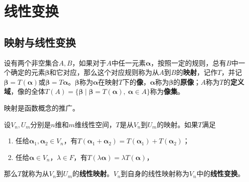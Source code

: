 


\section{线性变换}

\subsection{映射与线性变换}
\begin{definition}[映射]
设有两个非空集合$A,B$，如果对于$A$中任一元素$\boldsymbol{\alpha}$，按照一定的规则，总有$B$中一个确定的元素$\boldsymbol{\beta}$和它对应，那么这个对应规则称为从$A$到$B$的\textbf{映射}，记作$T$，并记$\boldsymbol{\beta}=T(\boldsymbol{\alpha})$或$\boldsymbol{\beta}=T\boldsymbol{\alpha}$。$\boldsymbol{\beta}$称为$\boldsymbol{\alpha}$在映射$T$下的\textbf{像}，$\boldsymbol{\alpha}$称为$\boldsymbol{\beta}$的\textbf{原像}；$A$称为$T$的\textbf{定义域}，像的全体$T(A)=\{\boldsymbol{\beta}\mid\boldsymbol{\beta}=T(\boldsymbol{\alpha}),\ \boldsymbol{\alpha}\in A\}$称为\textbf{像集}。
\end{definition}

映射是函数概念的推广。

\begin{definition}
设$V_n,U_m$分别是$n$维和$m$维线性空间，$T$是从$V_n$到$U_m$的映射。如果$T$满足
\begin{enumerate}
    \item[(i)] 任给$\boldsymbol{\alpha}_1,\boldsymbol{\alpha}_2\in V_n$，有$T(\boldsymbol{\alpha}_1+\boldsymbol{\alpha}_2)=T(\boldsymbol{\alpha}_1)+T(\boldsymbol{\alpha}_2)$；
    \item[(ii)] 任给$\boldsymbol{\alpha}\in V_n$，$\lambda\in F$，有$T(\lambda\boldsymbol{\alpha})=\lambda T(\boldsymbol{\alpha})$，
\end{enumerate}
那么$T$就称为从$V_n$到$U_m$的\textbf{线性映射}。$V_n$到自身的线性映射称为$V_n$中的\textbf{线性变换}。
\end{definition}

